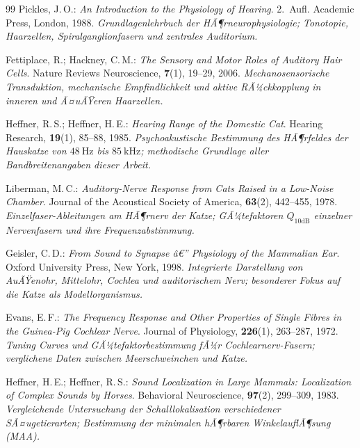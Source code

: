 ﻿\documentclass[12pt,a4paper,titlepage]{report}
\begin{document}
\begin{thebibliography}{99}
Pickles, J.\,O.:
\textit{An Introduction to the Physiology of Hearing}. 2.~Aufl.
Academic Press, London, 1988.
\newline\textit{Grundlagenlehrbuch der HÃ¶rneurophysiologie; Tonotopie,
Haarzellen, Spiralganglionfasern und zentrales Auditorium.}

Fettiplace, R.; Hackney, C.\,M.:
\textit{The Sensory and Motor Roles of Auditory Hair Cells}.
Nature Reviews Neuroscience, \textbf{7}(1), 19--29, 2006.
\newline\textit{Mechanosensorische Transduktion, mechanische Empfindlichkeit
und aktive RÃ¼ckkopplung in inneren und Ã¤uÃŸeren Haarzellen.}

Heffner, R.\,S.; Heffner, H.\,E.:
\textit{Hearing Range of the Domestic Cat}.
Hearing Research, \textbf{19}(1), 85--88, 1985.
\newline\textit{Psychoakustische Bestimmung des HÃ¶rfeldes der Hauskatze
von $\SI{48}{\hertz}$ bis $\SI{85}{\kilo\hertz}$; methodische Grundlage
aller Bandbreitenangaben dieser Arbeit.}

Liberman, M.\,C.:
\textit{Auditory-Nerve Response from Cats Raised in a Low-Noise Chamber}.
Journal of the Acoustical Society of America, \textbf{63}(2), 442--455, 1978.
\newline\textit{Einzelfaser-Ableitungen am HÃ¶rnerv der Katze; GÃ¼tefaktoren
$Q_{10\text{dB}}$ einzelner Nervenfasern und ihre Frequenzabstimmung.}

Geisler, C.\,D.:
\textit{From Sound to Synapse â€” Physiology of the Mammalian Ear}.
Oxford University Press, New York, 1998.
\newline\textit{Integrierte Darstellung von AuÃŸenohr, Mittelohr, Cochlea und
auditorischem Nerv; besonderer Fokus auf die Katze als Modellorganismus.}

Evans, E.\,F.:
\textit{The Frequency Response and Other Properties of Single Fibres in the
Guinea-Pig Cochlear Nerve}.
Journal of Physiology, \textbf{226}(1), 263--287, 1972.
\newline\textit{Tuning Curves und GÃ¼tefaktorbestimmung fÃ¼r Cochlearnerv-Fasern;
verglichene Daten zwischen Meerschweinchen und Katze.}

Heffner, H.\,E.; Heffner, R.\,S.:
\textit{Sound Localization in Large Mammals: Localization of Complex Sounds
by Horses}.
Behavioral Neuroscience, \textbf{97}(2), 299--309, 1983.
\newline\textit{Vergleichende Untersuchung der Schalllokalisation verschiedener
SÃ¤ugetierarten; Bestimmung der minimalen hÃ¶rbaren WinkelauflÃ¶sung (MAA).}


\end{thebibliography}
\end{document}

